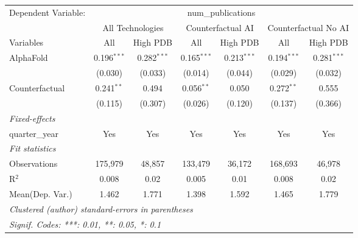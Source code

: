 \begingroup
\centering
\begin{tabular}{lcccccc}
   \tabularnewline \midrule \midrule
   Dependent Variable: & \multicolumn{6}{c}{num\_publications}\\
 & \multicolumn{2}{c}{All Technologies} & \multicolumn{2}{c}{Counterfactual AI} & \multicolumn{2}{c}{Counterfactual No AI} \\
\cmidrule(lr){1-1}\cmidrule(lr){2-3} \cmidrule(lr){4-5} \cmidrule(lr){6-7}
Variables & \multicolumn{1}{c}{All} & \multicolumn{1}{c}{High PDB} & \multicolumn{1}{c}{All} & \multicolumn{1}{c}{High PDB} & \multicolumn{1}{c}{All} & \multicolumn{1}{c}{High PDB} \\
\cmidrule(lr){1-1}\cmidrule(lr){2-2} \cmidrule(lr){3-3} \cmidrule(lr){4-4} \cmidrule(lr){5-5} \cmidrule(lr){6-6} \cmidrule(lr){7-7}
   AlphaFold      & 0.196$^{***}$ & 0.282$^{***}$ & 0.165$^{***}$ & 0.213$^{***}$ & 0.194$^{***}$ & 0.281$^{***}$\\   
                  & (0.030)       & (0.033)       & (0.014)       & (0.044)       & (0.029)       & (0.032)\\   
   Counterfactual & 0.241$^{**}$  & 0.494         & 0.056$^{**}$  & 0.050         & 0.272$^{**}$  & 0.555\\   
                  & (0.115)       & (0.307)       & (0.026)       & (0.120)       & (0.137)       & (0.366)\\   
   \midrule
   \emph{Fixed-effects}\\
   quarter\_year  & Yes           & Yes           & Yes           & Yes           & Yes           & Yes\\  
   \midrule
   \emph{Fit statistics}\\
   Observations   & 175,979       & 48,857        & 133,479       & 36,172        & 168,693       & 46,978\\  
   R$^2$          & 0.008         & 0.02          & 0.005         & 0.01          & 0.008         & 0.02\\  
Mean(Dep. Var.) & 1.462 & 1.771 & 1.398 & 1.592 & 1.465 & 1.779 \\
   \midrule \midrule
   \multicolumn{7}{l}{\emph{Clustered (author) standard-errors in parentheses}}\\
   \multicolumn{7}{l}{\emph{Signif. Codes: ***: 0.01, **: 0.05, *: 0.1}}\\
\end{tabular}
\par\endgroup
